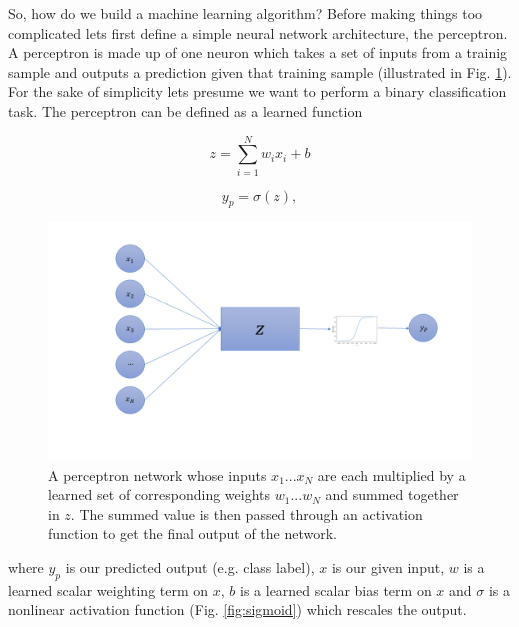 %
%
So, how do we build a machine learning algorithm? Before making things too complicated lets first define a simple neural network architecture, the perceptron. A perceptron is made up of one neuron which takes a set of inputs from a trainig sample and outputs a prediction given that training sample (illustrated in Fig. \ref{fig:Perceptron_network}). For the sake of simplicity lets presume we want to perform a binary classification task. The perceptron can be defined as a learned function

\begin{equation}
    z = \sum_{i=1}^{N} w_{i} x_{i} + b
\end{equation}{}

\begin{equation}
    y_{p} = \sigma(z),
\end{equation}{}

\begin{figure}
    \centering
    \includegraphics[width=\linewidth]{figures/Perceptron_network.png}
    \caption{A perceptron network whose inputs $x_1 ... x_N$ are each multiplied 
    by a learned set of corresponding weights $w_1 ... w_N$ and summed together in $z$. 
    The summed value is then passed through an activation function to get the final 
    output of the network.}
    \label{fig:Perceptron_network}
\end{figure}

where $y_{p}$ is our predicted output (e.g. class label), $x$ is our given input, $w$ is a learned scalar weighting term on $x$, $b$ is a learned scalar bias term on $x$ and $\sigma$ is a nonlinear activation function (Fig. \ref{fig:sigmoid}) which rescales the output.

